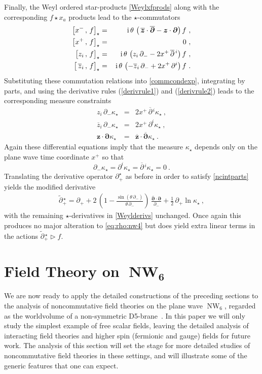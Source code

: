 \documentclass[11pt,a4paper]{article}
\DeclareMathOperator{\NW}{NW}
\newcommand{\cb}[2]{\bigl[#1\,,\,#2\bigr]}                 %
\def\nn{\nonumber}
\def\d{\partial}
\def\bfd{{\mbf\partial}}
\def\bfz{{\mbf z}}
\def\od{\overline{\partial}}
\def\oz{\overline{z}}
\def\obfd{\overline{\mbf\partial}}
\def\obfz{\overline{\mbf z}}
\newcommand{\1}{\mathbb{1}}
\newcommand{\mbf}[1]{{\boldsymbol {#1} }}
\def\ii{{\,{\rm i}\,}}
\def\mdell{{\mbf\partial}}
\newcommand{\newsection}{\setcounter{equation}{0}\section}
\def\nn{\nonumber}
\def\d{\partial}
\newcommand{\beq}{\begin{eqnarray}}
\newcommand{\eeq}{\end{eqnarray}}
\begin{document}
Finally, the Weyl ordered star-products \eqref{Weylxfprods} along with
the corresponding $f\star x_a$ products lead to the
$\star$-commutators
\begin{eqnarray}
  \nn \cb{x^-}{f}_\star&=&\ii\theta\,\left(\,\obfz\cdot\obfd
    -\bfz\cdot\bfd\right)f \ , \\ \nn
  \cb{x^+}{f}_\star&=&0 \ , \\ \nn
   \cb{z_i}{f}_\star&=&\ii\theta\,\left(z_i\,\d_-
    -2x^+\,\od{}^{\,i}\right)f \ , \\
  \cb{\,\oz_i}{f}_\star&=&\ii\theta\,\left(-\oz_i\,\d_-
    +2x^+\,\d^i\right)f \ .
\label{eq:weyl:comm}\end{eqnarray}
Substituting these commutation relations into \eqref{commcondexp},
integrating by parts, and using the derivative rules
(\ref{derivrule1}) and (\ref{derivrule2}) leads to the corresponding
measure constraints
\begin{eqnarray}
   \nn  z_i\,\d_-\kappa_\star&=&2x^+\,\od{}^{\,i}\kappa_\star \ , \\ \nn
  \oz_i\,\d_-\kappa_\star&=&2x^+\,\d^i\kappa_\star \ , \\
  \bfz\cdot\bfd\kappa_\star&=&\obfz\cdot\obfd\kappa_\star \ .
\label{eq:weyl:mu:all}\end{eqnarray}
Again these differential equations imply that the measure
$\kappa_\star$ depends only on the plane wave time coordinate $x^+$ so
that
\begin{equation}
  \label{eq:weyl:mu}
  \d_-\kappa_\star=\d^i\kappa_\star=\od{}^{\,i}\kappa_\star=0 \ .
\end{equation}
Translating the derivative operator $\d_+^\star$ as before in order to
satisfy \eqref{ncintparts} yields the modified derivative
\beq
  \label{eq:weyl:d}
  \widetilde\d{}^{\,\star}_+=\d_++2\,
\left(1-\frac{\sin(\theta\,\partial_-)}{\theta\,\partial_-}
\right)\,\frac{\overline{\mdell}\cdot\mdell}{\partial_-}+
\mbox{$\frac12$}\,\d_+\ln\kappa_\star \ ,
\eeq
with the remaining $\star$-derivatives in \eqref{Weylderivs}
unchanged. Once again this produces no major alteration to
\eqref{eq:rho:nw4} but does yield extra linear terms in the actions
$\widetilde\d{}^{\,\star}_+\triangleright f$.

\newsection{Field Theory on $\mbf{\NW_6}$\label{FieldTheory}}

We are now ready to apply the detailed constructions of the preceding
sections to the analysis of noncommutative field theories on the plane
wave $\NW_6$, regarded as the worldvolume of a non-symmetric
D5-brane~\cite{KNSanjay1}. In this paper we will only study the
simplest example of free scalar fields, leaving the detailed analysis
of interacting field theories and higher spin (fermionic and gauge)
fields for future work. The analysis of this section will set the
stage for more detailed studies of noncommutative field theories in
these settings, and will illustrate some of the generic features that
one can expect.
\end{document}
